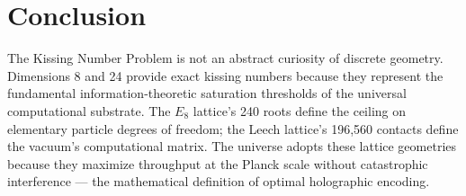 \documentclass[12pt, a4paper]{article}
\theoremstyle{plain}
\theoremstyle{definition}
\begin{document}
\section{Conclusion}

The Kissing Number Problem is not an abstract curiosity of discrete geometry. Dimensions 8 and 24 provide exact kissing numbers because they represent the fundamental information-theoretic saturation thresholds of the universal computational substrate. The $E_8$ lattice's 240 roots define the ceiling on elementary particle degrees of freedom; the Leech lattice's 196,560 contacts define the vacuum's computational matrix. The universe adopts these lattice geometries because they maximize throughput at the Planck scale without catastrophic interference --- the mathematical definition of optimal holographic encoding.

\vspace{2em}
\noindent\hrulefill
\vspace{1em}







\vspace{3em}
\noindent\hrulefill
\vspace{1em}
\end{document}
